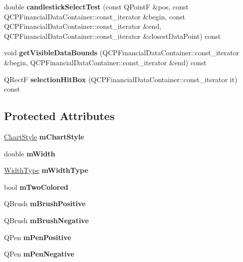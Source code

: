 \begin{DoxyCompactItemize}
\mbox{\label{classQCPFinancial_a9783e91a33fd08a402b1a3821d43e471}} 
double {\bfseries candlestick\+Select\+Test} (const Q\+PointF \&pos, const Q\+C\+P\+Financial\+Data\+Container\+::const\+\_\+iterator \&begin, const Q\+C\+P\+Financial\+Data\+Container\+::const\+\_\+iterator \&end, Q\+C\+P\+Financial\+Data\+Container\+::const\+\_\+iterator \&closest\+Data\+Point) const
\item 
\mbox{\label{classQCPFinancial_a31a3dda8b6b9a5b674e28f1daeb21a75}} 
void {\bfseries get\+Visible\+Data\+Bounds} (Q\+C\+P\+Financial\+Data\+Container\+::const\+\_\+iterator \&begin, Q\+C\+P\+Financial\+Data\+Container\+::const\+\_\+iterator \&end) const
\item 
\mbox{\label{classQCPFinancial_afbe9e8cb0de3e9e789a9668b29cad098}} 
Q\+RectF {\bfseries selection\+Hit\+Box} (Q\+C\+P\+Financial\+Data\+Container\+::const\+\_\+iterator it) const
\end{DoxyCompactItemize}
\subsection*{Protected Attributes}
\begin{DoxyCompactItemize}
\item 
\mbox{\label{classQCPFinancial_ab65c2ce8d6354451870bb44b894c1e92}} 
\hyperlink{classQCPFinancial_a0f800e21ee98d646dfc6f8f89d10ebfb}{Chart\+Style} {\bfseries m\+Chart\+Style}
\item 
\mbox{\label{classQCPFinancial_af630e5eb8485146b9c777e63fd1cf993}} 
double {\bfseries m\+Width}
\item 
\mbox{\label{classQCPFinancial_a7926204997e04c9de9dbe1f092df125a}} 
\hyperlink{classQCPFinancial_aef1761dda71a53dc5269685e9e492626}{Width\+Type} {\bfseries m\+Width\+Type}
\item 
\mbox{\label{classQCPFinancial_a6afe919190b884d9bac026cefcc8c0a8}} 
bool {\bfseries m\+Two\+Colored}
\item 
\mbox{\label{classQCPFinancial_ab7e6eed16260a2f88ca6bd940dffea79}} 
Q\+Brush {\bfseries m\+Brush\+Positive}
\item 
\mbox{\label{classQCPFinancial_acb0e31874b7a1deb56bd42e8ab3e68f2}} 
Q\+Brush {\bfseries m\+Brush\+Negative}
\item 
\mbox{\label{classQCPFinancial_aa6599186f417ba615caebb3f6c762bd8}} 
Q\+Pen {\bfseries m\+Pen\+Positive}
\item 
\mbox{\label{classQCPFinancial_a263fbfefde2cc19c8d4024a8319c2bbb}} 
Q\+Pen {\bfseries m\+Pen\+Negative}
\end{DoxyCompactItemize}
